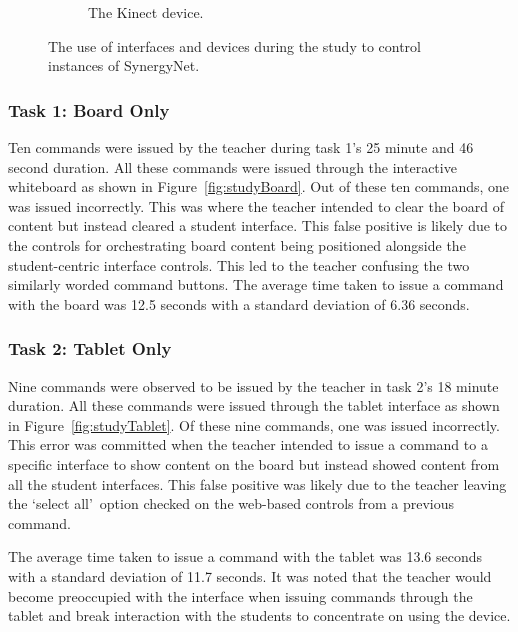 \documentclass[link]{IWCOMP}
\begin{document}
\begin{figure}[t]
\begin{subfigure}[t]{0.3\textwidth}
		\caption{The Kinect device.}
		\label{fig:studyKinect}
	\end{subfigure}
   	\caption{The use of interfaces and devices during the study to control instances of SynergyNet.}
   	\label{fig:studyDevices}
\end{figure} 

\subsubsection{Task 1: Board Only}
\label{subsubsec:pilotStudyResultsTask1}

Ten commands were issued by the teacher during task 1's 25 minute and 46 second duration.
All these commands were issued through the interactive whiteboard as shown in Figure~\ref{fig:studyBoard}.
Out of these ten commands, one was issued incorrectly.
This was where the teacher intended to clear the board of content but instead cleared a student interface.
This false positive is likely due to the controls for orchestrating board content being positioned alongside the student-centric interface controls.
This led to the teacher confusing the two similarly worded command buttons.
The average time taken to issue a command with the board was 12.5 seconds with a standard deviation of 6.36 seconds.

\subsubsection{Task 2: Tablet Only}
\label{subsubsec:pilotStudyResultsTask2}

Nine commands were observed to be issued by the teacher in task 2's 18 minute duration.
All these commands were issued through the tablet interface as shown in Figure~\ref{fig:studyTablet}.
Of these nine commands, one was issued incorrectly.
This error was committed when the teacher intended to issue a command to a specific interface to show content on the board but instead showed content from all the student interfaces.
This false positive was likely due to the teacher leaving the \lq select all\rq\ option checked on the web-based controls from a previous command.

The average time taken to issue a command with the tablet was 13.6 seconds with a standard deviation of 11.7 seconds.
It was noted that the teacher would become preoccupied with the interface when issuing commands through the tablet and break interaction with the students to concentrate on using the device.
\end{document}
